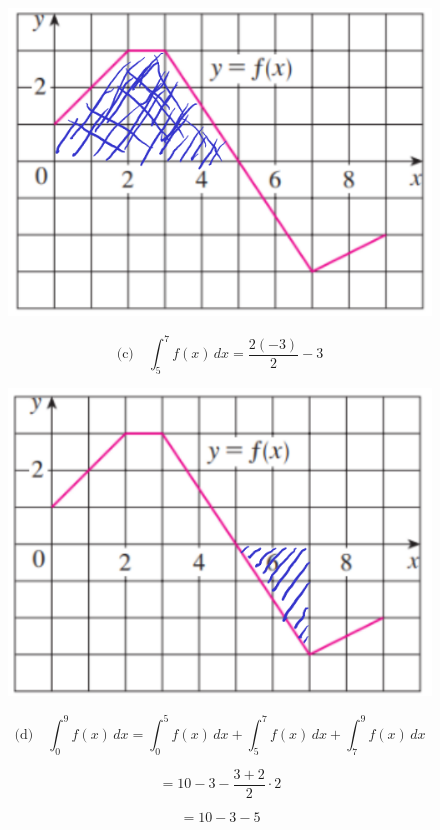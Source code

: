 \begin{figure}[H]
    \centering
    \includegraphics[scale=0.3]{images/integral3.png}
\end{figure}

\[
\text{(c)} \quad \int_{5}^{7} f(x)\,dx 
= \frac{2(-3)}{2} -3
\]

\begin{figure}[H]
    \centering
    \includegraphics[scale=0.3]{images/integral4.png}
\end{figure}

\[
\text{(d)} \quad \int_{0}^{9} f(x)\,dx 
= \int_{0}^{5} f(x)\,dx + \int_{5}^{7} f(x)\,dx + \int_{7}^{9} f(x)\,dx
\]

\[
= 10 - 3 - \frac{3+2}{2} \cdot 2
\]

\[
= 10 - 3 - 5
\]

